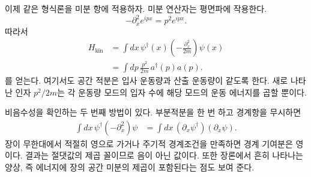 이제 같은 형식론을 미분 항에 적용하자. 미분 연산자는 평면파에 작용한다.
\begin{equation}
-\partial_x^2 e^{ipx}=p^2e^{ipx}.
\end{equation}
따라서
\begin{align}
H_{\mathrm{kin}}
&=\int dx\,\psi^\dagger(x)
\left(-\frac{\partial_x^2}{2m}\right)\psi(x)\\
&=\int dp\,\frac{p^2}{2m}\,a^\dagger(p)a(p).
\label{eq:l9-kinetic-momentum}
\end{align}
를 얻는다. 여기서도 공간 적분은 입사 운동량과 산출 운동량이 같도록 한다. 새로 나타난 인자 \(p^2/2m\)는 각 운동량 모드의 입자 수에 해당 모드의 운동 에너지를 곱할 뿐이다.

\begin{classroomqa}\end{classroomqa}

\begin{classroomqa}\end{classroomqa}

\begin{classroomqa}\end{classroomqa}

비음수성을 확인하는 두 번째 방법이 있다. 부분적분을 한 번 하고 경계항을 무시하면
\begin{align}
\int dx\,\psi^\dagger(-\partial_x^2)\psi
&=\int dx\,(\partial_x\psi^\dagger)(\partial_x\psi).
\label{eq:l9-positive-kinetic}
\end{align}
장이 무한대에서 적절히 영으로 가거나 주기적 경계조건을 만족하면 경계 기여분은 영이다. 결과는 절댓값의 제곱 꼴이므로 음이 아닌 값이다. 또한 장론에서 흔히 나타나는 양상, 즉 에너지에 장의 공간 미분의 제곱이 포함된다는 점도 보여 준다.

